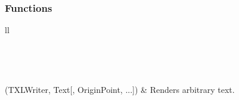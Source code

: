 \documentclass[letterpaper,10pt,english]{sphinxmanual}
\begin{document}
\subsubsection{Functions}
\label{Chapters/PythonModuleReference/ShapeLibrary/TXLWizard.ShapeLibrary.Label:functions}
\begin{longtable}{ll}
\hline
\endfirsthead

%
{{}} \\
\hline
\endhead

\hline {} \\ \hline
\endfoot

\endlastfoot


{\hyperref[Chapters/PythonModuleReference/ShapeLibrary/TXLWizard.ShapeLibrary.Label:TXLWizard.ShapeLibrary.Label.GetLabel]{}}(TXLWriter, Text{[}, OriginPoint, ...{]})
 & 
Renders arbitrary text.
\\
\hline\end{longtable}

\end{document}
